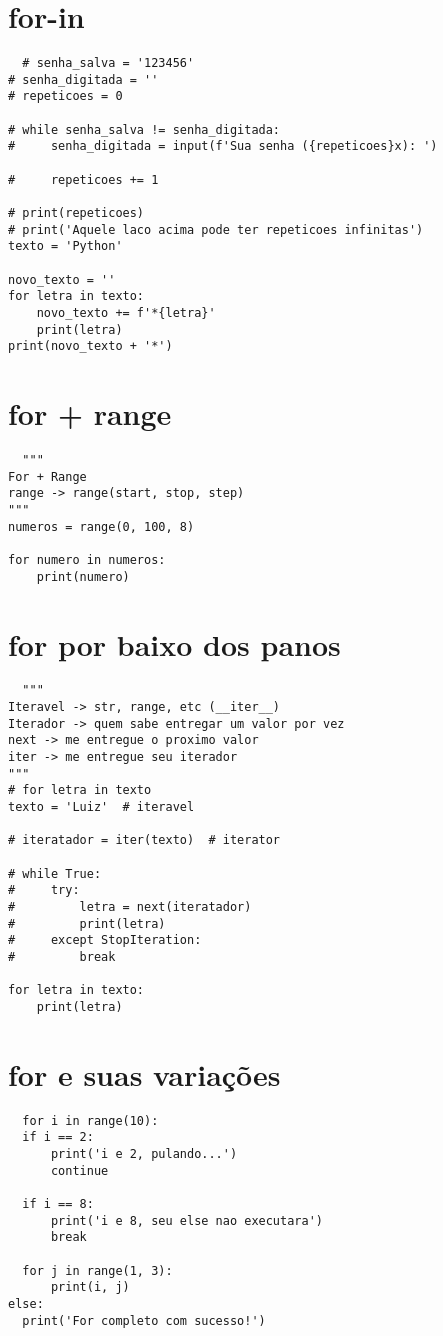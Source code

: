\documentclass{article}
\begin{document}
\section{for-in}
\begin{lstlisting}
  # senha_salva = '123456'
# senha_digitada = ''
# repeticoes = 0

# while senha_salva != senha_digitada:
#     senha_digitada = input(f'Sua senha ({repeticoes}x): ')

#     repeticoes += 1

# print(repeticoes)
# print('Aquele laco acima pode ter repeticoes infinitas')
texto = 'Python'

novo_texto = ''
for letra in texto:
    novo_texto += f'*{letra}'
    print(letra)
print(novo_texto + '*')
\end{lstlisting}
\section{for + range}
\begin{lstlisting}
  """
For + Range
range -> range(start, stop, step)
"""
numeros = range(0, 100, 8)

for numero in numeros:
    print(numero)
\end{lstlisting}
\section{for por baixo dos panos}
\begin{lstlisting}
  """
Iteravel -> str, range, etc (__iter__)
Iterador -> quem sabe entregar um valor por vez
next -> me entregue o proximo valor
iter -> me entregue seu iterador
"""
# for letra in texto
texto = 'Luiz'  # iteravel

# iteratador = iter(texto)  # iterator

# while True:
#     try:
#         letra = next(iteratador)
#         print(letra)
#     except StopIteration:
#         break

for letra in texto:
    print(letra)
\end{lstlisting}
\section{for e suas variações}
\begin{lstlisting}
  for i in range(10):
  if i == 2:
      print('i e 2, pulando...')
      continue

  if i == 8:
      print('i e 8, seu else nao executara')
      break

  for j in range(1, 3):
      print(i, j)
else:
  print('For completo com sucesso!') 
\end{lstlisting}
\end{document}

